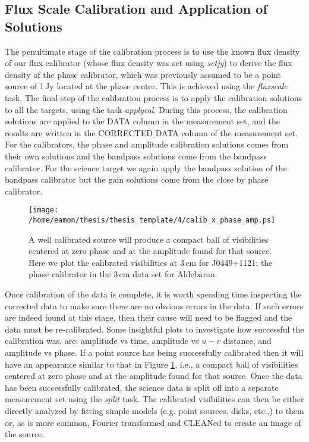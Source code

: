 \subsection{Flux Scale Calibration and Application of Solutions}\label{subsec:2.4}
The penultimate stage of the calibration process is to use the known flux density of our flux calibrator (whose flux density was set using \textit{setjy}) to derive the flux density of the phase calibrator, which was previously assumed to be a point source of 1\,Jy located at the phase center. This is achieved using the \textit{fluxscale} task. The final step of the calibration process is to apply the calibration solutions to all the targets, using the task \textit{applycal}. During this process, the calibration solutions are applied to the DATA column in the measurement set, and the results are written in the CORRECTED$\_$DATA column of the measurement set. For the calibrators, the phase and amplitude calibration solutions comes from their own solutions and the bandpass solutions come from the bandpass calibrator. For the science target we again apply the bandpass solution of the bandpass calibrator but the gain solutions come from the close by phase calibrator.

\begin{figure}[hbt!]
\centering 
\texttt{[image: /home/eamon/thesis/thesis\_template/4/calib\_x\_phase\_amp.ps]}  
\caption[Example of a well calibrated source.]{A well calibrated source will produce a compact ball of visibilities centered at zero phase and at the amplitude found for that source. Here we plot the calibrated visibilities at 3\,cm for J0449+1121; the phase calibrator in the 3\,cm data set for Aldebaran.}
\label{fig:4.7}
\end{figure}

Once calibration of the data is complete, it is worth spending time inspecting the corrected data to make sure there are no obvious errors in the data. If such errors are indeed found at this stage, then their cause will need to be flagged and the data must be re-calibrated. Some insightful plots to investigate how successful the calibration was, are: amplitude vs time, amplitude vs $u-v$ distance, and amplitude vs phase. If a point source has being successfully calibrated then it will have an appearance similar to that in Figure \ref{fig:4.7}, i.e., a compact ball of visibilities centered at zero phase and at the amplitude found for that source. Once the data has been successfully calibrated, the science data is split off into a separate measurement set using the \textit{split} task. The calibrated visibilities can then be either directly analyzed by fitting simple models (e.g. point sources, disks, etc.,) to them or, as is more common, Fourier transformed and CLEANed to create an image of the source.

